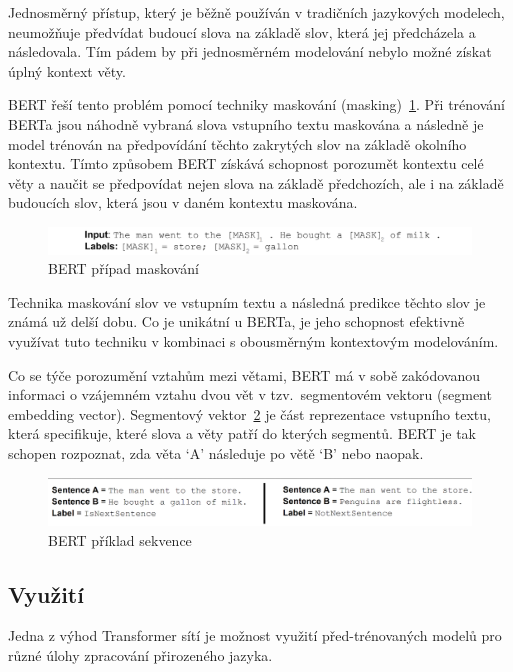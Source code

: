 Jednosměrný přístup, který je běžně používán v tradičních jazykových modelech, neumožňuje předvídat budoucí slova na základě slov, která jej předcházela a následovala.
Tím pádem by při jednosměrném modelování nebylo možné získat úplný kontext věty.

BERT řeší tento problém pomocí techniky maskování (masking)~\ref{fig:BERT maskovani}.
Při trénování BERTa jsou náhodně vybraná slova vstupního textu maskována a následně je model trénován na předpovídání těchto zakrytých slov na základě okolního kontextu.
Tímto způsobem BERT získává schopnost porozumět kontextu celé věty a naučit se předpovídat nejen slova na základě předchozích, ale i na základě budoucích slov, která jsou v daném kontextu maskována.

\begin{figure}[H]
	\centering
	\includegraphics[width=1\textwidth]{Figures/BERT_bi.png}
	\caption{BERT případ maskování~\cite{link24}}\label{fig:BERT maskovani}
\end{figure}

Technika maskování slov ve vstupním textu a následná predikce těchto slov je známá už delší dobu.
Co je unikátní u BERTa, je jeho schopnost efektivně využívat tuto techniku v kombinaci s obousměrným kontextovým modelováním.

Co se týče porozumění vztahům mezi větami, BERT má v sobě zakódovanou informaci o vzájemném vztahu dvou vět v tzv.\ segmentovém vektoru (segment embedding vector).
Segmentový vektor~\ref{fig:BERT priklad sekvence} je část reprezentace vstupního textu, která specifikuje, které slova a věty patří do kterých segmentů.
BERT je tak schopen rozpoznat, zda věta `A' následuje po větě `B' nebo naopak.

\begin{figure}[H]
	\centering
	\includegraphics[width=1\textwidth]{Figures/BERT_sequence.png}
	\caption{BERT příklad sekvence~\cite{link24}}\label{fig:BERT priklad sekvence}
\end{figure}

\subsection{Využití}
Jedna z výhod Transformer sítí je možnost využití před-trénovaných modelů pro různé úlohy zpracování přirozeného jazyka.

